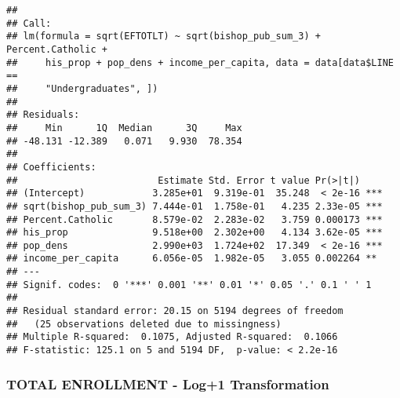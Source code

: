 \documentclass[]{article}
\newenvironment{Shaded}{\begin{snugshade}}{\end{snugshade}}
\newcommand{\KeywordTok}[1]{\textcolor[rgb]{0.13,0.29,0.53}{\textbf{#1}}}
\newcommand{\DataTypeTok}[1]{\textcolor[rgb]{0.13,0.29,0.53}{#1}}
\newcommand{\DecValTok}[1]{\textcolor[rgb]{0.00,0.00,0.81}{#1}}
\newcommand{\StringTok}[1]{\textcolor[rgb]{0.31,0.60,0.02}{#1}}
\newcommand{\OperatorTok}[1]{\textcolor[rgb]{0.81,0.36,0.00}{\textbf{#1}}}
\newcommand{\NormalTok}[1]{#1}
\begin{document}
\begin{verbatim}
## 
## Call:
## lm(formula = sqrt(EFTOTLT) ~ sqrt(bishop_pub_sum_3) + Percent.Catholic + 
##     his_prop + pop_dens + income_per_capita, data = data[data$LINE == 
##     "Undergraduates", ])
## 
## Residuals:
##     Min      1Q  Median      3Q     Max 
## -48.131 -12.389   0.071   9.930  78.354 
## 
## Coefficients:
##                         Estimate Std. Error t value Pr(>|t|)    
## (Intercept)            3.285e+01  9.319e-01  35.248  < 2e-16 ***
## sqrt(bishop_pub_sum_3) 7.444e-01  1.758e-01   4.235 2.33e-05 ***
## Percent.Catholic       8.579e-02  2.283e-02   3.759 0.000173 ***
## his_prop               9.518e+00  2.302e+00   4.134 3.62e-05 ***
## pop_dens               2.990e+03  1.724e+02  17.349  < 2e-16 ***
## income_per_capita      6.056e-05  1.982e-05   3.055 0.002264 ** 
## ---
## Signif. codes:  0 '***' 0.001 '**' 0.01 '*' 0.05 '.' 0.1 ' ' 1
## 
## Residual standard error: 20.15 on 5194 degrees of freedom
##   (25 observations deleted due to missingness)
## Multiple R-squared:  0.1075, Adjusted R-squared:  0.1066 
## F-statistic: 125.1 on 5 and 5194 DF,  p-value: < 2.2e-16
\end{verbatim}

\subsubsection{TOTAL ENROLLMENT - Log+1
Transformation}\label{total-enrollment---log1-transformation}

\begin{Shaded}
\end{Shaded}
\end{document}
